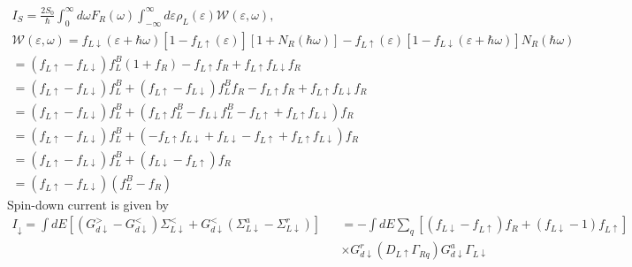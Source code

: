 \documentclass[aps,prb,superscriptaddress]{revtex4-2}
\begin{document}
\begin{gather}
I_S=\frac{2 S_0}{\hbar} \int_0^{\infty} d \omega F_R(\omega) \int_{-\infty}^{\infty} d \varepsilon \rho_L(\varepsilon) \mathcal{W}(\varepsilon, \omega), \\ 
\mathcal{W}(\varepsilon, \omega)=  f_{L \downarrow}(\varepsilon+\hbar \omega)\left[1-f_{L \uparrow}(\varepsilon)\right]\left[1+N_R(\hbar \omega)\right]  -f_{L \uparrow}(\varepsilon)\left[1-f_{L \downarrow}(\varepsilon+\hbar \omega)\right] N_R(\hbar \omega)\\ \nonumber
=(f_{L\uparrow}-f_{L\downarrow})f_{L}^B(1+f_R) - f_{L\uparrow}f_R +f_{L\uparrow}f_{L\downarrow}f_R \\ \nonumber
=(f_{L\uparrow}-f_{L\downarrow})f_{L}^B + (f_{L\uparrow}-f_{L\downarrow})f_{L}^Bf_R - f_{L\uparrow}f_R +f_{L\uparrow}f_{L\downarrow}f_R \\ \nonumber
=(f_{L\uparrow}-f_{L\downarrow})f_{L}^B + (f_{L\uparrow}f_{L}^B - f_{L\downarrow} f_{L}^B - f_{L\uparrow} +f_{L\uparrow}f_{L\downarrow})f_R \\ \nonumber
=(f_{L\uparrow}-f_{L\downarrow})f_{L}^B + (-f_{L\uparrow}f_{L\downarrow}+f_{L\downarrow} - f_{L\uparrow} +f_{L\uparrow}f_{L\downarrow})f_R \\ \nonumber
= (f_{L\uparrow}-f_{L\downarrow})f_{L}^B + (f_{L\downarrow} - f_{L\uparrow})f_R \\
= (f_{L\uparrow}-f_{L\downarrow})(f_{L}^B - f_R )
\end{gather}
Spin-down current is given by
\begin{eqnarray}
I_{\downarrow} = \int dE [(G_{d\downarrow}^>-G_{d\downarrow}^< )\Sigma_{L\downarrow}^< +G_{d\downarrow}^< (\Sigma_{L\downarrow}^a-\Sigma_{L\downarrow}^r)]&&=-\int dE \sum_q [(f_{L\downarrow}-f_{L\uparrow})f_R+(f_{L\downarrow}-1)f_{L\uparrow}]\nonumber\\
&&\times G^r_{d\downarrow} (D_{L\uparrow} \Gamma_{Rq}) G^a_{d\downarrow}\Gamma_{L\downarrow} \nonumber
\end{eqnarray}
\end{document}

